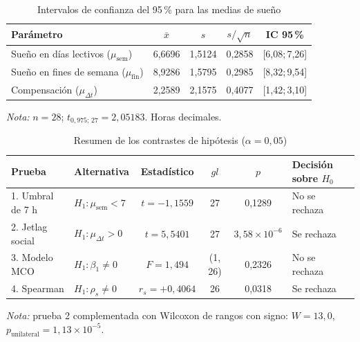 \begin{table}[H]
\centering
\caption{Intervalos de confianza del 95\,\% para las medias de sueño}
\label{tab:c9}
\footnotesize
\begin{tabular}{lcccc}
\toprule
\textbf{Parámetro} & \textbf{$\bar{x}$} & \textbf{$s$} & \textbf{$s/\sqrt{n}$} & \textbf{IC 95\,\%} \\
\midrule
Sueño en días lectivos ($\mu_{\text{sem}}$) & 6,6696 & 1,5124 & 0,2858 & [6,08;\,7,26] \\
Sueño en fines de semana ($\mu_{\text{fin}}$) & 8,9286 & 1,5795 & 0,2985 & [8,32;\,9,54] \\
Compensación ($\mu_{\Delta t}$) & 2,2589 & 2,1575 & 0,4077 & [1,42;\,3,10] \\
\bottomrule
\end{tabular}
\par\smallskip\parbox{0.92\linewidth}{\footnotesize\textit{Nota:} $n = 28$; $t_{0{,}975;\,27} = 2,05183$. Horas decimales.}
\fuente
\end{table}

\begin{table}[H]
\centering
\caption{Resumen de los contrastes de hipótesis ($\alpha = 0{,}05$)}
\label{tab:c10}
\footnotesize
\begin{tabular}{llcccl}
\toprule
\textbf{Prueba} & \textbf{Alternativa} & \textbf{Estadístico} & \textbf{$gl$} & \textbf{$p$} & \textbf{Decisión sobre $H_0$} \\
\midrule
1. Umbral de 7 h & $H_1: \mu_{\text{sem}} < 7$ & $t = -1,1559$ & 27 & 0,1289 & No se rechaza \\
2. Jetlag social & $H_1: \mu_{\Delta t} > 0$ & $t = 5,5401$ & 27 & $3,58\times 10^{-6}$ & Se rechaza \\
3. Modelo MCO & $H_1: \beta_1 \neq 0$ & $F = 1,494$ & (1, 26) & 0,2326 & No se rechaza \\
4. Spearman & $H_1: \rho_s \neq 0$ & $r_s = +0,4064$ & 26 & 0,0318 & Se rechaza \\
\bottomrule
\end{tabular}
\par\smallskip\parbox{0.92\linewidth}{\footnotesize\textit{Nota:} prueba 2 complementada con Wilcoxon de rangos con signo: $W = 13,0$, $p_{\text{unilateral}} = 1,13\times 10^{-5}$.}
\fuente
\end{table}
